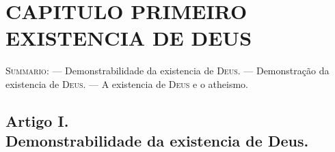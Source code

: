 


\chapter*{CAPITULO PRIMEIRO\\[0.3em]\large EXISTENCIA DE DEUS}

{\small\noindent\textsc{Summario}: --- Demonstrabilidade da existencia de \textsc{Deus}. --- Demonstração da existencia de \textsc{Deus}. --- A existencia de \textsc{Deus} e o atheismo.\par}


\section*{Artigo I.\\ Demonstrabilidade da existencia de Deus.}

